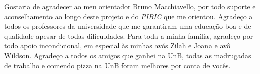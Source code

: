 Gostaria de agradecer ao meu orientador Bruno Macchiavello, por todo suporte e aconselhamento ao longo deste projeto e do \textit{PIBIC} que me orientou. Agradeço a todos os professores da universidade que me garantiram uma educação boa e de qualidade apesar de todas dificuldades. Para toda a minha família, agradeço por todo apoio incondicional, em especial às minhas avós Zilah e Joana e avô Wildson. Agradeço a todos os amigos que ganhei na UnB, todas as madrugadas de trabalho e comendo pizza na UnB foram melhores por conta de vocês.